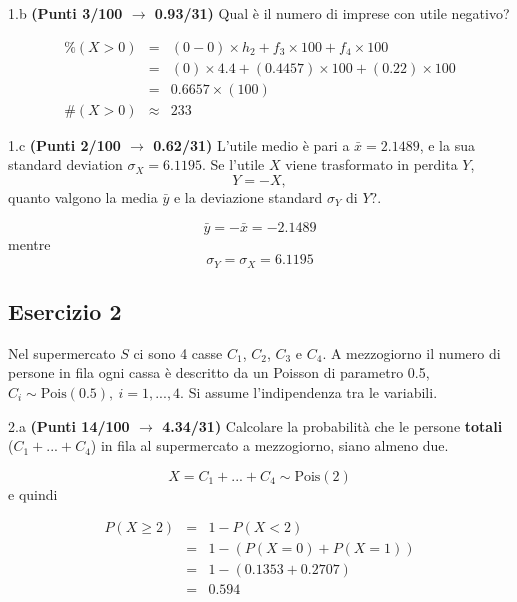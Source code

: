 \documentclass[
  11pt,
]{book}
\theoremstyle{mytheoremstyle}
\theoremstyle{mydefstyle}
\newenvironment{sol}
  {
  \begin{tcolorbox}[enhanced,breakable,arc=0.1mm,boxrule=1pt,colback=white,colframe=iblue,
  title=\bf \fontfamily{lmss}\selectfont \hspace{.5 cm} Soluzione,drop fuzzy shadow]

}{
\end{tcolorbox}
  }
\begin{document}
1.b \textbf{(Punti 3/100 \(\rightarrow\) 0.93/31)} Qual è il numero di imprese con utile negativo?

\begin{sol}
\begin{eqnarray*}
     \%(X> 0 ) &=& ( 0 - 0 )\times h_{ 2 }+ f_{ 3 }\times 100+f_{ 4 }\times 100 \\
              &=& ( 0 )\times 4.4 + ( 0.4457 )\times 100+( 0.22 )\times 100 \\
              &=&  0.6657 \times(100)\\
     \#(X> 0 ) &\approx& 233 
         \end{eqnarray*}

\end{sol}

1.c \textbf{(Punti 2/100 \(\rightarrow\) 0.62/31)} L'utile medio è pari a \(\bar x=2.1489\), e la sua standard deviation
\(\sigma_X=6.1195\). Se l'utile \(X\) viene trasformato in perdita \(Y\),
\[
Y=-X,
\]
quanto valgono la media \(\bar y\) e la deviazione standard \(\sigma_Y\) di \(Y\)?.

\begin{sol}
\[
\bar y=-\bar x=-2.1489
\]
mentre
\[
\sigma_Y=\sigma_X=6.1195
\]

\end{sol}

\subsection{Esercizio 2}\label{esercizio-2-4}

Nel supermercato \(S\) ci sono 4 casse \(C_1\), \(C_2\), \(C_3\) e \(C_4\). A mezzogiorno il numero di persone in fila ogni cassa è descritto da un Poisson di parametro 0.5, \(C_i\sim\text{Pois}(0.5),~i=1,...,4\). Si assume l'indipendenza tra le variabili.

2.a \textbf{(Punti 14/100 \(\rightarrow\) 4.34/31)} Calcolare la probabilità che le persone \textbf{totali} (\(C_1+...+C_4\)) in fila al supermercato a mezzogiorno, siano almeno due.

\begin{sol}
\[
X=C_1+...+C_4\sim \text{Pois}(2)
\]
e quindi

\begin{eqnarray*}
P(X\ge 2)&=&1-P(X< 2)\\
&=&1-(P(X=0)+P(X=1))\\
&=&1-(0.1353+0.2707)\\
&=&0.594
\end{eqnarray*}

\end{sol}
\end{document}

